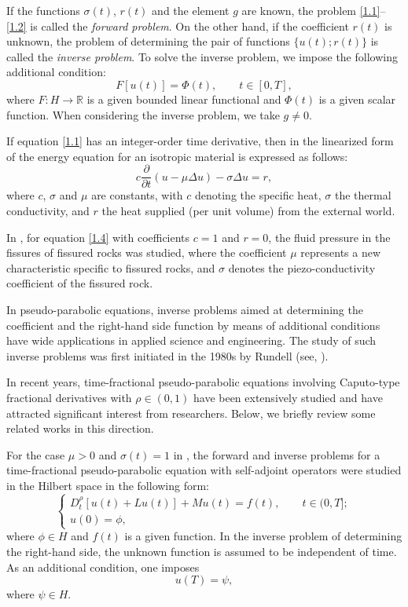\documentclass[reqno]{amsart}
\theoremstyle{definition}
\numberwithin{equation}{section}
\begin{document}
If the functions $\sigma(t)$, $r(t)$ and the element $g$ are known, the problem \eqref{1.1}–\eqref{1.2} is called the \textit{forward problem}. 
On the other hand, if the coefficient $r(t)$ is unknown, the problem of determining the pair of functions $\{u(t); r(t)\}$ is called the \textit{inverse problem}. 
To solve the inverse problem, we impose the following additional condition:
\begin{equation} \label{1.3}
F[u(t)] = \Phi(t), \qquad t \in [0,T],
\end{equation}
where $F:H \to \mathbb{R}$ is a given bounded linear functional and $\Phi(t)$ is a given scalar function. When considering the inverse problem, we take $g \ne 0$.

If equation \eqref{1.1} has an integer-order time derivative, then in \cite{Chen} the linearized form of the energy equation for an isotropic material is expressed as follows:
\begin{equation} \label{1.4}
   c \frac{\partial}{\partial t} \left ( u - \mu \Delta u\right) - \sigma \Delta u = r, 
\end{equation}
where $c$, $\sigma$ and $\mu$ are constants, with $c$ denoting the specific heat, $\sigma$ the thermal conductivity, and $r$ the heat supplied (per unit volume) from the external world.

In \cite{Barenblat_Kochiva}, for equation \eqref{1.4} with coefficients $c=1$ and $r=0$, the fluid pressure in the fissures of fissured rocks was studied, where the coefficient $\mu$ represents a new characteristic specific to fissured rocks, and $\sigma$ denotes the piezo-conductivity coefficient of the fissured rock.

In pseudo-parabolic equations, inverse problems aimed at determining the coefficient and the right-hand side function by means of additional conditions have wide applications in applied science and engineering. The study of such inverse problems was first initiated in the 1980s by Rundell (see, \cite{Rundell}).

In recent years, time-fractional pseudo-parabolic equations involving Caputo-type fractional derivatives with $\rho \in (0,1)$ have been extensively studied and have attracted significant interest from researchers. Below, we briefly review some related works in this direction.

For the case $\mu>0$ and $\sigma(t)=1$ in \cite{Ruzhansky_psedo}, the forward and inverse problems for a time-fractional pseudo-parabolic equation with self-adjoint operators were studied in the Hilbert space in the following form:
$$
\begin{cases}
D_t^\rho[u(t)+L u(t)]+M u(t)=f(t), \qquad t \in (0,T]; \\
u(0)=\phi,
\end{cases}
$$
where $\phi \in H$ and $f(t)$ is a given function. In the inverse problem of determining the right-hand side, the unknown function is assumed to be independent of time. As an additional condition, one imposes
$$
 u(T)=\psi,
$$
where $\psi \in H$.
\end{document}
